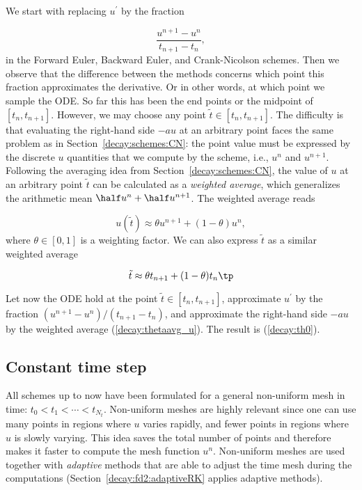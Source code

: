 \documentclass[graybox,sectrefs,envcountresetchap,open=right,final]{svmonodo}
\newenvironment{notice_mdfboxadmon}[1][]{
\begin{notice_mdfboxmdframed}[frametitle=#1]
}
{
\end{notice_mdfboxmdframed}
}
\begin{document}
\begin{notice_mdfboxadmon}[Derivation.]
We start with replacing $u^{\prime}$ by the fraction

\begin{equation*} \frac{u^{n+1}-u^{n}}{t_{n+1}-t_n},\end{equation*}
in the Forward Euler, Backward Euler,
and Crank-Nicolson schemes. Then we observe that
the difference between the methods concerns which point this
fraction approximates the derivative. Or in other words, at which point we
sample the ODE. So far this has been the
end points or the midpoint of $[t_n,t_{n+1}]$. However, we may choose any point
$\tilde t \in [t_n,t_{n+1}]$.
The difficulty
is that evaluating the right-hand side $-au$ at an arbitrary point
faces the same problem as in
Section~\ref{decay:schemes:CN}: the point value must be expressed
by the discrete $u$ quantities that we compute by the scheme, i.e.,
$u^n$ and $u^{n+1}$. Following the averaging idea from
Section~\ref{decay:schemes:CN},
the value of $u$ at an arbitrary point $\tilde t$ can be
calculated as a \emph{weighted average}, which generalizes the arithmetic mean
$\half u^n + {\half}u^{n+1}$.
The weighted average reads

\begin{equation}
u(\tilde t) \approx \theta u^{n+1} + (1-\theta) u^{n},
\label{decay:thetaavg_u}
\end{equation}
where $\theta\in [0,1]$ is a weighting factor.
We can also express $\tilde t$ as a similar weighted average

\begin{equation}
\tilde t \approx \theta t_{n+1} + (1-\theta) t_{n}\tp
\label{decay:thetaavg_t}
\end{equation}

Let now the ODE hold at the point
$\tilde t\in [t_n,t_{n+1}]$, approximate $u^{\prime}$ by the fraction
$(u^{n+1}-u^{n})/(t_{n+1}-t_n)$, and approximate the right-hand
side $-au$ by the weighted average (\ref{decay:thetaavg_u}).
The result is (\ref{decay:th0}).
\end{notice_mdfboxadmon}



\subsection{Constant time step}

All schemes up to now have been formulated for a general non-uniform
mesh in time: $t_0 < t_1 < \cdots < t_{N_t}$.
Non-uniform meshes are highly relevant
since one can use many points in regions where $u$ varies rapidly, and
fewer points in regions where $u$ is slowly varying. This idea saves
the total number of points and therefore makes it faster to compute the mesh
function $u^n$. Non-uniform meshes are used together with
\emph{adaptive} methods that are able to adjust the time mesh during the
computations (Section~\ref{decay:fd2:adaptiveRK} applies adaptive methods).
\end{document}
